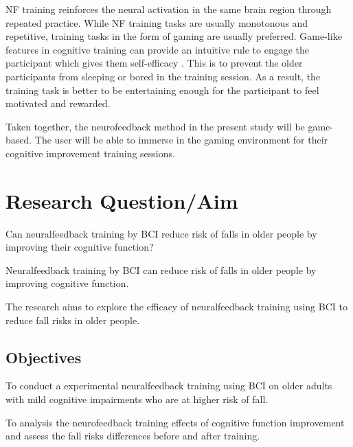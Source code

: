 \documentclass{article}
\begin{document}
NF training reinforces the neural activation in the same brain region through repeated practice. While NF training tasks are usually monotonous and repetitive, training tasks in the form of gaming are usually preferred. Game-like features in cognitive training can provide an intuitive rule to engage the participant which gives them self-efficacy \cite{McGonigal_2011}. This is to prevent the older participants from sleeping or bored in the training session. As a result, the training task is better to be entertaining enough for the participant to feel motivated and rewarded. 


Taken together, the neurofeedback method in the present study will be game-based. The user will be able to immerse in the gaming environment for their cognitive improvement training sessions. 

\section{Research Question/Aim}
\begin{description}[font=$\bullet$~\normalfont\textbf]
\item [Research Question:] Can neuralfeedback training by BCI reduce risk of falls in older people by improving their cognitive function?
\item [Present hypothesis:] Neuralfeedback training by BCI can reduce risk of falls in older people by improving cognitive function. 
\end{description}

The research aims to explore the efficacy of neuralfeedback training using BCI to reduce fall risks in older people.

\subsection{Objectives}
\begin{description}[font=$\bullet$~\normalfont\textbf]
\item To conduct a experimental neuralfeedback training using BCI on older adults with mild cognitive impairments who are at higher risk of fall.
\item  To analysis the neurofeedback training effects of cognitive function improvement and assess the fall risks differences before and after training.
\end{description}
\end{document}
